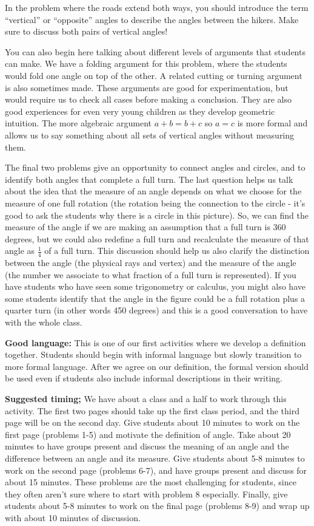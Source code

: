 \documentclass[nooutcomes,noauthor]{ximera}
\begin{document}
\begin{instructorNotes}
In the problem where the roads extend both ways, you should introduce the term ``vertical'' or ``opposite'' angles to describe the angles between the hikers.  Make sure to discuss both pairs of vertical angles!

You can also begin here talking about different levels of arguments that students can make.  We have a folding argument for this problem, where the students would fold one angle on top of the other.  A related cutting or turning argument is also sometimes made.  These arguments are good for experimentation, but would require us to check all cases before making a conclusion.  They are also good experiences for even very young children as they develop geometric intuition.  The more algebraic argument $a+b = b+c$ so $a = c$ is more formal and allows us to say something about all sets of vertical angles without measuring them.

The final two problems give an opportunity to connect angles and circles, and to identify both angles that complete a full turn. The last question helps us talk about the idea that the measure of an angle depends on what we choose for the measure of one full rotation (the rotation being the connection to the circle - it's good to ask the students why there is a circle in this picture). So, we can find the measure of the angle if we are making an assumption that a full turn is $360$ degrees, but we could also redefine a full turn and recalculate the measure of that angle as $\frac{1}{4}$ of a full turn. This discussion should help us also clarify the distinction between the angle (the physical rays and vertex) and the measure of the angle (the number we associate to what fraction of a full turn is represented). If you have students who have seen some trigonometry or calculus, you might also have some students identify that the angle in the figure could be a full rotation plus a quarter turn (in other words 450 degrees) and this is a good conversation to have with the whole class.


{\bf Good language:} This is one of our first activities where we develop a definition together. Students should begin with informal language but slowly transition to more formal language. After we agree on our definition, the formal version should be used even if students also include informal descriptions in their writing.


{\bf Suggested timing;} We have about a class and a half to work through this activity. The first two pages should take up the first class period, and the third page will be on the second day. Give students about 10 minutes to work on the first page (problems 1-5) and motivate the definition of angle. Take about 20 minutes to have groups present and discuss the meaning of an angle and the difference between an angle and its measure.  Give students about 5-8 minutes to work on the second page (problems 6-7), and have groups present and discuss for about 15 minutes. These problems are the most challenging for students, since they often aren't sure where to start with problem 8 especially. Finally, give students about 5-8 minutes to work on the final page (problems 8-9) and wrap up with about 10 minutes of discussion.

\end{instructorNotes}
\end{document}
